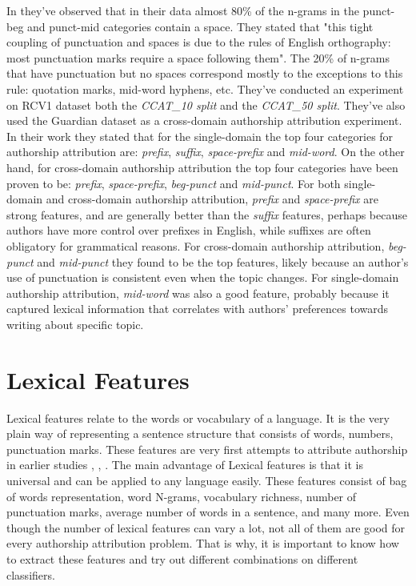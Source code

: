 In \cite{sapkota2015not} they've observed that in their data almost 80\% of the n-grams in the punct-beg and punct-mid categories contain a space. They stated that "this tight coupling of punctuation and spaces is due to the rules of English orthography: most punctuation marks require a space following them". The 20\% of n-grams that have punctuation but no spaces correspond mostly to the exceptions to this rule: quotation marks, mid-word hyphens, etc.
They've conducted an experiment on RCV1 dataset both the \textit{CCAT\_10 split} and the \textit{CCAT\_50 split}. They've also used the Guardian dataset as a cross-domain authorship attribution experiment. In their work they stated that for the single-domain the top four categories for authorship attribution are: \textit{prefix}, \textit{suffix}, \textit{space-prefix} and \textit{mid-word}. On the other hand, for cross-domain authorship attribution the top four categories have been proven to be: \textit{prefix}, \textit{space-prefix}, \textit{beg-punct} and \textit{mid-punct}.
For both single-domain and cross-domain authorship attribution, \textit{prefix} and \textit{space-prefix} are strong features, and are generally better than the \textit{suffix} features, perhaps because authors have more control over prefixes in English,
while suffixes are often obligatory for grammatical reasons. For cross-domain authorship attribution, \textit{beg-punct} and \textit{mid-punct} they found to be the top features, likely because an author’s use of punctuation is consistent even when the topic
changes. For single-domain authorship attribution, \textit{mid-word} was also
a good feature, probably because it captured lexical information that correlates with authors’ preferences towards writing about specific topic.

\section{Lexical Features}

Lexical features relate to the words or vocabulary of a language. It is the very plain way of representing a sentence structure that consists of words, numbers, punctuation marks. These features are very first attempts to attribute authorship in earlier studies \cite{fox2012statistical}, \cite{argamon2005measuring}, \cite{stanko2013whose}. The main advantage of Lexical features is that it is universal and can be applied to any language easily. These features consist of bag of words representation, word N-grams, vocabulary richness, number of punctuation marks, average number of words in a sentence, and many more. Even though the number of lexical features can vary a lot, not all of them are good for every authorship attribution problem. That is why, it is important to know how to extract these features and try out different combinations on different classifiers.

